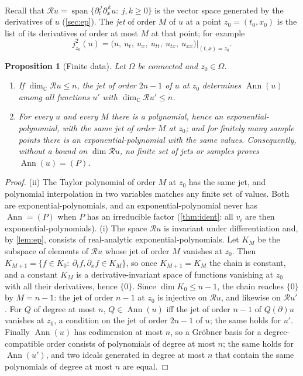 \documentclass[11pt]{article}
\theoremstyle{plain}
\newtheorem{proposition}[theorem]{Proposition}
\theoremstyle{definition}
\theoremstyle{remark}
\newcommand{\C}{\mathbb{C}}
\newcommand{\ring}{\mathcal{R}}            %
\DeclareMathOperator{\Ann}{Ann}             %
\DeclareMathOperator{\spn}{span}
\begin{document}
Recall that $\ring u=\spn\{\partial_t^{\,j}\partial_x^{\,k}u:\ j,k\ge0\}$ is the vector space generated by the
derivatives of $u$ (\cref{sec:ep}). The \emph{jet} of order $M$ of $u$ at a point $z_0=(t_0,x_0)$ is the list of its
derivatives of order at most $M$ at that point; for example
\[
  j^2_{z_0}(u)=\big(u,\ u_t,\ u_x,\ u_{tt},\ u_{tx},\ u_{xx}\big)\big|_{(t,x)=z_0}.
\]

\begin{proposition}[Finite data]\label{prop:certify}\label{thm:nocert}\label{thm:blackbox}
Let $\Omega$ be connected and $z_0\in\Omega$.
\begin{enumerate}[label=(\roman*)]
  \item If $\dim_\C\ring u\le n$, the jet of order $2n-1$ of $u$ at $z_0$ determines $\Ann(u)$ among all functions
  $u'$ with $\dim_\C\ring u'\le n$.
  \item For every $u$ and every $M$ there is a polynomial, hence an exponential-polynomial, with the same jet of
  order $M$ at $z_0$; and for finitely many sample points there is an exponential-polynomial with the same values.
  Consequently, without a bound on $\dim\ring u$, no finite set of jets or samples proves $\Ann(u)=(P)$.
\end{enumerate}
\end{proposition}

\begin{proof}
(ii) The Taylor polynomial of order $M$ at $z_0$ has the same jet, and polynomial interpolation in two variables
matches any finite set of values. Both are exponential-polynomials, and an exponential-polynomial never has
$\Ann=(P)$ when $P$ has an irreducible factor (\cref{thm:ident}: all $v_i$ are then exponential-polynomials).
(i) The space $\ring u$ is invariant under differentiation and, by \cref{lem:ep}, consists of real-analytic
exponential-polynomials. Let $K_M$ be the subspace of elements of $\ring u$ whose jet of order $M$ vanishes at $z_0$.
Then $K_{M+1}=\{f\in K_0:\ \partial_tf,\partial_xf\in K_M\}$, so once $K_{M+1}=K_M$ the chain is constant, and a
constant $K_M$ is a derivative-invariant space of functions vanishing at $z_0$ with all their derivatives, hence
$\{0\}$. Since $\dim K_0\le n-1$, the chain reaches $\{0\}$ by $M=n-1$: the jet of order $n-1$ at $z_0$ is injective
on $\ring u$, and likewise on $\ring u'$. For $Q$ of degree at most $n$, $Q\in\Ann(u)$ iff the jet of order
$n-1$ of $Q(\partial)u$ vanishes at $z_0$, a condition on the jet of order $2n-1$ of $u$; the same holds for $u'$.
Finally $\Ann(u)$ has codimension at most $n$, so a Gr\"obner basis for a degree-compatible order consists of
polynomials of degree at most $n$; the same holds for $\Ann(u')$, and two ideals generated in degree at most $n$
that contain the same polynomials of degree at most $n$ are equal.
\end{proof}
\end{document}
